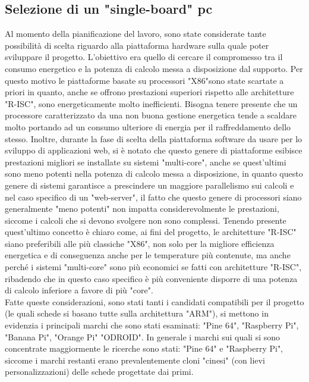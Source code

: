 \subsection{Selezione di un "single-board" pc}
Al momento della pianificazione del lavoro, sono state considerate tante possibilità di scelta riguardo alla piattaforma hardware sulla quale poter sviluppare il progetto. L'obiettivo era quello di cercare il compromesso tra il consumo energetico e la potenza di calcolo messa a disposizione dal supporto. Per questo motivo le piattaforme basate su processori "X86"sono state scartate a priori in quanto, anche se offrono prestazioni superiori rispetto alle architetture "R-ISC", sono energeticamente molto inefficienti. Bisogna tenere presente che un processore caratterizzato da una non buona gestione energetica tende a scaldare molto portando ad un consumo ulteriore di energia per il raffreddamento dello stesso.  Inoltre, durante la fase di scelta della piattaforma software da usare per lo sviluppo di applicazioni web, si è notato che questo genere di piattaforme esibisce prestazioni migliori se installate su sistemi "multi-core", anche se quest'ultimi sono meno potenti nella potenza di calcolo messa a disposizione, in quanto questo genere di sistemi garantisce a prescindere un maggiore parallelismo sui calcoli e nel caso specifico di un "web-server", il fatto che questo genere di processori siano generalmente "meno potenti" non impatta considerevolmente le prestazioni, siccome i calcoli che si devono svolgere non sono complessi. Tenendo presente quest'ultimo concetto è chiaro come, ai fini del progetto, le architetture "R-ISC" siano preferibili alle più classiche "X86", non solo per la migliore efficienza energetica e di conseguenza anche per le temperature più contenute, ma anche perché i sistemi "multi-core" sono più economici se fatti con architetture "R-ISC", ribadendo che in questo caso specifico è più conveniente disporre di una potenza di calcolo inferiore a favore di più "core".\\
Fatte queste considerazioni, sono stati tanti i candidati compatibili per il progetto (le quali schede si basano tutte sulla architettura "ARM"), si mettono in evidenzia i principali marchi che sono stati esaminati: "Pine 64", "Raspberry Pi", "Banana Pi", "Orange Pi" "ODROID". In generale i marchi sui quali si sono concentrate maggiormente le ricerche sono stati: "Pine 64" e "Raspberry Pi", siccome i marchi restanti erano prevalentemente cloni "cinesi" (con lievi personalizzazioni) delle schede progettate dai primi.\\
